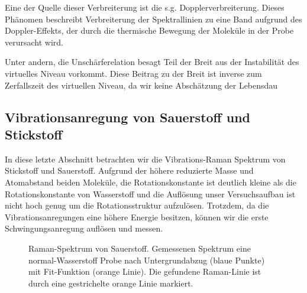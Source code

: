 \documentclass[11 pt]{article}
\begin{document}
Eine der Quelle dieser Verbreiterung ist die s.g. Dopplerverbreiterung. Dieses Phänomen beschreibt Verbreiterung der Spektrallinien zu eine Band aufgrund des Doppler-Effekts, der durch die thermische Bewegung der Moleküle in der Probe verursacht wird. 


 Unter andern, die Unschärferelation besagt Teil der Breit aus der Instabilität des virtuelles Niveau vorkommt. Diese Beitrag zu der Breit ist inverse zum Zerfallszeit des virtuellen Niveau, da wir keine Abschätzung der Lebensdau


\subsection{Vibrationsanregung von Sauerstoff und Stickstoff}
In diese letzte Abschnitt betrachten wir die Vibrations-Raman Spektrum von Stickstoff und Sauerstoff. Aufgrund der höhere reduzierte Masse und Atomabstand beiden Moleküle, die Rotationskonstante ist deutlich kleine als die Rotationskonstante von Wasserstoff und die Auflösung unser Versuchsaufbau ist nicht hoch genug um die Rotationsstruktur aufzulösen. Trotzdem, da die Vibrationsanregungen eine höhere Energie besitzen, können wir die erste Schwingungsanregung auflösen und messen. 

\begin{figure}[htbp]
	\centering
   \caption{\small Raman-Spektrum von Sauerstoff. Gemessenen Spektrum eine normal-Wasserstoff Probe nach Untergrundabzug (blaue Punkte) mit Fit-Funktion (orange Linie). Die gefundene Raman-Linie ist durch eine gestrichelte orange Linie markiert.}
   \label{fig:O2}
\end{figure}
\end{document}
